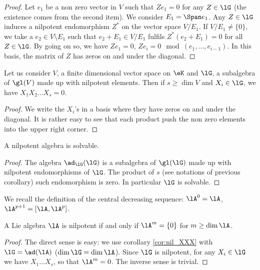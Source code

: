 \begin{proof}
 Let $e_1$ be a non zero vector in $V$ such that $Ze_1=0$ for any $Z\in\lG$ (the existence comes from the second item). We consider $E_1=\Span e_1$. Any $Z\in\lG$ induces a nilpotent endomorphism $Z^*$ on the vector space $V/E_1$. If $V/E_1\neq\{0\}$, we take a $e_2\in V\setminus E_1$ such that $e_2+E_1\in V/E_1$ fulfils $Z^*(e_2+E_1)=0$ for all $Z\in\lG$. By going on so, we have $Ze_1=0$, $Ze_i=0\mod(e_1,\ldots,e_{i-1})$. In this basis, the matrix of $Z$ has zeros on and under the diagonal.
\end{proof}

\begin{corollary}
Let us consider $V$, a finite dimensional vector space on $\eK$ and $\lG$, a subalgebra of $\gl(V)$ made up with nilpotent elements. Then if $s\geq\dim V$ and $X_i\in\lG$, we have $X_1X_2\ldots X_s=0$.
\label{cor:nil_XXX}
\end{corollary}

\begin{proof}
We write the $X_i$'s in a basis where they have zeros on and under the diagonal. It is rather easy to see that each product push the non zero elements into the upper right corner.
\end{proof}

\begin{corollary}
A nilpotent algebra is solvable.
\end{corollary}

\begin{proof}
The algebra $\ad_{\lG}(\lG)$ is a subalgebra of $\gl(\lG)$ made up with nilpotent endomorphisms of $\lG$. The product of $s$ (see notations of previous corollary) such endomorphism is zero. In particular $\lG$ is solvable.
\end{proof}

We recall the definition of the central decreasing sequence: $\lA^0=\lA$, $\lA^{p+1}=[\lA,\lA^p]$.

\begin{corollary}
A Lie algebra $\lA$ is nilpotent if and only if $\lA^m=\{0\}$ for $m\geq\dim\lA$.
\label{cor:nil_Gn}
\end{corollary}

\begin{proof}
The direct sense is easy: we use corollary \ref{cor:nil_XXX} with $\lG=\ad(\lA)$ ($\dim\lG=\dim\lA$). Since $\lG$ is nilpotent, for any $X_i\in\lG$ we have $X_1\ldots X_s$, so that $\lA^m=0$. The inverse sense is trivial.

\end{proof}

